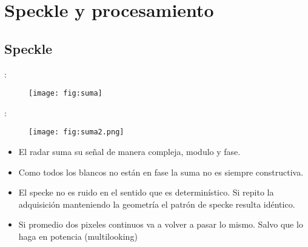 \section{Speckle y procesamiento}
\subsection{Speckle}
\begin{frame}{\secname : \subsecname}
  \begin{figure}
    \centering
    \texttt{[image: fig:suma]}
    \caption{ }
    \label{}
  \end{figure}
\end{frame}

\begin{frame}{\secname : \subsecname}
  \begin{figure}
    \centering
    \texttt{[image: fig:suma2.png]}
    \caption{ }
    \label{}
  \end{figure}
  \begin{itemize}
    \item El radar suma su señal de manera compleja, modulo y fase.
    \item Como todos los blancos no están en fase la suma no es siempre constructiva.
    \item El specke no es ruido en el sentido que es determinístico. Si repito la adquisición manteniendo la geometría el patrón de specke resulta idéntico.
    \item Si promedio dos pixeles continuos va a volver a pasar lo mismo. Salvo que lo haga en potencia (multilooking)
  \end{itemize}
\end{frame}

